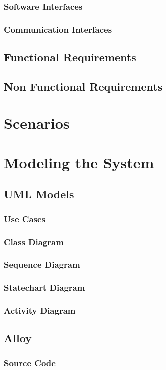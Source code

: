 \documentclass[11pt,a4paper]{report}
\begin{document}
\subsection{Software Interfaces}
\subsection{Communication Interfaces}
\section{Functional Requirements}
\section{Non Functional Requirements}
\chapter{Scenarios}
\chapter{Modeling the System}
\section{UML Models}
\subsection{Use Cases}
\subsection{Class Diagram}
\subsection{Sequence Diagram}
\subsection{Statechart Diagram}
\subsection{Activity Diagram}
\section{Alloy}
\subsection{Source Code}
\end{document}
